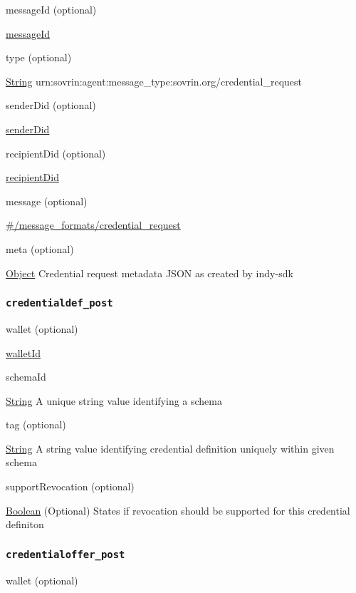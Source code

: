 messageId (optional)

{\protect\hyperlink{messageId}{messageId}}

type (optional)

{\protect\hyperlink{string}{String}}
urn:sovrin:agent:message\_type:sovrin.org/credential\_request

senderDid (optional)

{\protect\hyperlink{senderDid}{senderDid}}

recipientDid (optional)

{\protect\hyperlink{recipientDid}{recipientDid}}

message (optional)

{\protect\hyperlink{ux5cux23ux2fmessage_formatsux2fcredential_request}{\#/message\_formats/credential\_request}}

meta (optional)

{\protect\hyperlink{object}{Object}} Credential request metadata JSON as
created by indy-sdk

\hypertarget{credentialdef_post}{%
\subsubsection{\texorpdfstring{\protect\hypertarget{credentialdef_post}{}{\texttt{credentialdef\_post}}}{credentialdef\_post}}\label{credentialdef_post}}

wallet (optional)

{\protect\hyperlink{walletId}{walletId}}

schemaId

{\protect\hyperlink{string}{String}} A unique string value identifying a
schema

tag (optional)

{\protect\hyperlink{string}{String}} A string value identifying
credential definition uniquely within given schema

supportRevocation (optional)

{\protect\hyperlink{boolean}{Boolean}} (Optional) States if revocation
should be supported for this credential definiton

\hypertarget{credentialoffer_post}{%
\subsubsection{\texorpdfstring{\protect\hypertarget{credentialoffer_post}{}{\texttt{credentialoffer\_post}}}{credentialoffer\_post}}\label{credentialoffer_post}}

wallet (optional)

